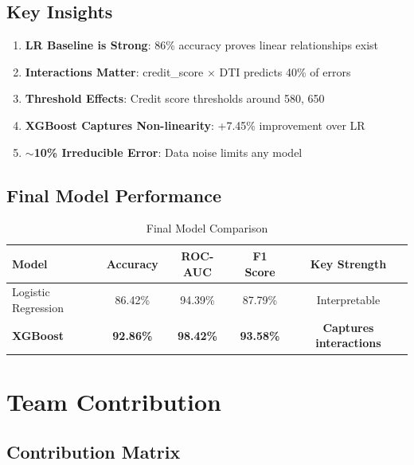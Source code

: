 \documentclass[12pt,a4paper]{article}
\begin{document}
\subsection{Key Insights}

\begin{enumerate}
    \item \textbf{LR Baseline is Strong}: 86\% accuracy proves linear relationships exist
    \item \textbf{Interactions Matter}: credit\_score $\times$ DTI predicts 40\% of errors
    \item \textbf{Threshold Effects}: Credit score thresholds around 580, 650
    \item \textbf{XGBoost Captures Non-linearity}: +7.45\% improvement over LR
    \item \textbf{$\sim$10\% Irreducible Error}: Data noise limits any model
\end{enumerate}

\subsection{Final Model Performance}

\begin{table}[H]
\centering
\caption{Final Model Comparison}
\begin{tabular}{lcccc}
\toprule
\textbf{Model} & \textbf{Accuracy} & \textbf{ROC-AUC} & \textbf{F1 Score} & \textbf{Key Strength} \\
\midrule
Logistic Regression & 86.42\% & 94.39\% & 87.79\% & Interpretable \\
\textbf{XGBoost} & \textbf{92.86\%} & \textbf{98.42\%} & \textbf{93.58\%} & \textbf{Captures interactions} \\
\bottomrule
\end{tabular}
\end{table}

\newpage

\section{Team Contribution}

\subsection{Contribution Matrix}
\end{document}
